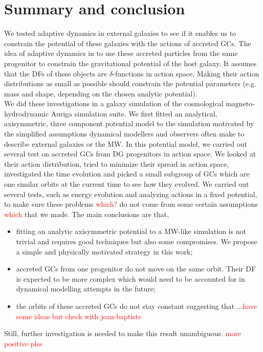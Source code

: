 \section{Summary and conclusion}\label{sec:sumconc}
We tested adaptive dynamics in external galaxies to see if it enables us to constrain the potential of these galaxies with the actions of accreted \acp{GC}. The idea of adaptive dynamics in to use these accreted particles from the same progenitor to constrain the gravitational potential of the host galaxy. It assumes that the \acp{DF} of these objects are $\delta$-functions in action space. Making their action distributions as small as possible should constrain the potential parameters (e.g. mass and shape, depending on the chosen analytic potential). 
\\We did these investigations in a galaxy simulation of the cosmological magneto-hydrodynamic Auriga simulation suite. We first fitted an analytical, axisymmetric, three component potential model to the simulation motivated by the simplified assumptions dynamical modellers and observers often make to describe external galaxies or the \ac{MW}. In this potential model, we carried out several test on accreted \acp{GC} from \ac{DG} progenitors in action space. We looked at their action distribution, tried to minimize their spread in action space, investigated the time evolution and picked a small subgroup of \acp{GC} which are one similar orbits at the current time to see how they evolved. We carried out several tests, such as energy evolution and analyzing actions in a fixed potential, to make sure these problems \textcolor{red}{which?} do not come from some certain assumptions \textcolor{red}{which} that we made. The main conclusions are that,
\begin{itemize}
    \item fitting an analytic axisymmetric potential to a \ac{MW}-like simulation is not trivial and requires good techniques but also some compromises. We propose a simple and physically motivated strategy in this work;
    \item accreted \acp{GC} from one progenitor do not move on the same orbit. Their \ac{DF} is expected to be more complex which would need to be accounted for in dynamical modelling attempts in the future;
    \item the orbits of these accreted \acp{GC} do not stay constant suggesting that ...\textcolor{red}{have some ideas but check with jean-baptiste}
\end{itemize}
Still, further investigation is needed to make this result unambiguous. \textcolor{red}{more positive plss}